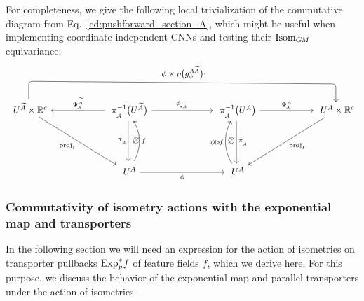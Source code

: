 For completeness, we give the following local trivialization of the commutative diagram from Eq.~\eqref{cd:pushforward_section_A}, which might be useful when implementing coordinate independent CNNs and testing their $\operatorname{Isom}_{G\mkern-1.4muM}$-equivariance:
\begin{equation}\label{cd:pushforward_A_coord}
\begin{tikzcd}[column sep=60pt, row sep=45, font=\normalsize,
                   execute at end picture={
                        \node [] at (-1.87, -.07) {$\noncommutative$};
                        \node [] at ( 1.87, -.07) {$\noncommutative$};
                        }]
    U^{\widetilde{A}} \times \R^c
        \arrow[rd, "\proj_1"']
        \arrow[rrr, rounded corners, to path={ 
                -- ([yshift=2em]\tikztostart.north) 
                --node[above]{\small$\phi \times \rho\big(g^{A\widetilde{A}}_\phi\big) \cdot$} ([yshift=2em]\tikztotarget.north) 
                -- (\tikztotarget.north)
                }]
    &
    \piA^{-1}\big(U^{\widetilde{A}}\big)
        \arrow[r, "\dphiA"]
        \arrow[d, "\piA"']
        \arrow[l, "\PsiA^{\widetilde{A}}"']
    &[2ex]
    \piA^{-1}\big(U^A\big)
        \arrow[d, "\piA"]
        \arrow[r, "\PsiA^A"]
    &
    U^A \times \R^c
        \arrow[ld, "\proj_1"]
    \\
    &
    U^{\widetilde{A}}
        \arrow[r, "\phi"']
        \arrow[u, "f"', bend right=28]
    &
    U^A
        \arrow[u, "\ \phi\rhd\!f", bend left=28]
\end{tikzcd}
\end{equation}






\subsubsection{Commutativity of isometry actions with the exponential map and transporters}
\label{sec:isom_expmap_transport}

In the following section we will need an expression for the action of isometries on transporter pullbacks $\operatorname{Exp}^*_p\mkern-2mu f$ of feature fields $f$, which we derive here.
For this purpose, we discuss the behavior of the exponential map and parallel transporters under the action of isometries.



